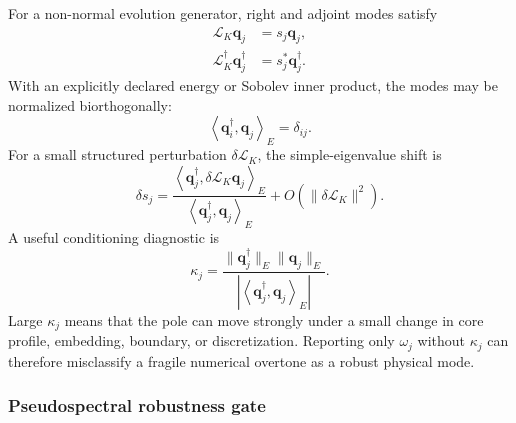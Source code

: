         For a non-normal evolution generator, right and adjoint modes satisfy
        \begin{align}
            \mathcal L_K\mathbf q_j
            &=
            s_j\mathbf q_j,
            \\
            \mathcal L_K^\dagger\mathbf q_j^\dagger
            &=
            s_j^\ast\mathbf q_j^\dagger.
        \end{align}
        With an explicitly declared energy or Sobolev inner product, the modes may be
        normalized biorthogonally:
        \begin{equation}
            \left\langle
                \mathbf q_i^\dagger,
                \mathbf q_j
            \right\rangle_E
            =
            \delta_{ij}.
            \label{eq:rt_qss_biorthogonality}
        \end{equation}
        For a small structured perturbation
        \(\delta\mathcal L_K\), the simple-eigenvalue shift is
        \begin{equation}
            \delta s_j
            =
            \frac{
                \left\langle
                    \mathbf q_j^\dagger,
                    \delta\mathcal L_K\mathbf q_j
                \right\rangle_E
            }{
                \left\langle
                    \mathbf q_j^\dagger,
                    \mathbf q_j
                \right\rangle_E
            }
            +
            O(\|\delta\mathcal L_K\|^2).
            \label{eq:rt_qss_adjoint_shift}
        \end{equation}
        A useful conditioning diagnostic is
        \begin{equation}
            \kappa_j
            =
            \frac{
                \|\mathbf q_j^\dagger\|_E
                \|\mathbf q_j\|_E
            }{
                \left|
                    \left\langle
                        \mathbf q_j^\dagger,
                        \mathbf q_j
                    \right\rangle_E
                \right|
            }.
            \label{eq:rt_qss_condition_number}
        \end{equation}
        Large \(\kappa_j\) means that the pole can move strongly under a small change in
        core profile, embedding, boundary, or discretization.  Reporting only
        \(\omega_j\) without \(\kappa_j\) can therefore misclassify a fragile numerical
        overtone as a robust physical mode.

    \subsubsection*{Pseudospectral robustness gate}

